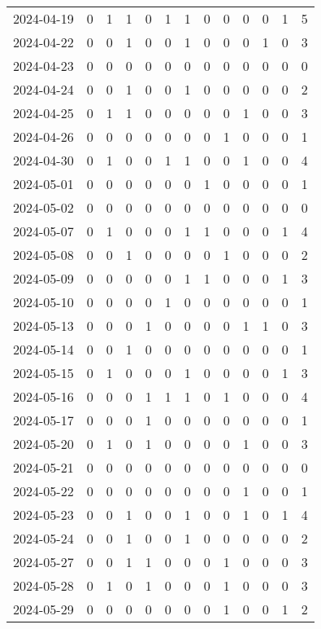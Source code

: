\documentclass[dvipdfmx,oneside]{article}
\begin{document}
\begin{longtable}{lcccccccccccc}
2024-04-19 & 0 & 1 & 1 & 0 & 1 & 1 & 0 & 0 & 0 & 0 & 1 & 5 \\
2024-04-22 & 0 & 0 & 1 & 0 & 0 & 1 & 0 & 0 & 0 & 1 & 0 & 3 \\
2024-04-23 & 0 & 0 & 0 & 0 & 0 & 0 & 0 & 0 & 0 & 0 & 0 & 0 \\
2024-04-24 & 0 & 0 & 1 & 0 & 0 & 1 & 0 & 0 & 0 & 0 & 0 & 2 \\
2024-04-25 & 0 & 1 & 1 & 0 & 0 & 0 & 0 & 0 & 1 & 0 & 0 & 3 \\
2024-04-26 & 0 & 0 & 0 & 0 & 0 & 0 & 0 & 1 & 0 & 0 & 0 & 1 \\
2024-04-30 & 0 & 1 & 0 & 0 & 1 & 1 & 0 & 0 & 1 & 0 & 0 & 4 \\
2024-05-01 & 0 & 0 & 0 & 0 & 0 & 0 & 1 & 0 & 0 & 0 & 0 & 1 \\
2024-05-02 & 0 & 0 & 0 & 0 & 0 & 0 & 0 & 0 & 0 & 0 & 0 & 0 \\
2024-05-07 & 0 & 1 & 0 & 0 & 0 & 1 & 1 & 0 & 0 & 0 & 1 & 4 \\
2024-05-08 & 0 & 0 & 1 & 0 & 0 & 0 & 0 & 1 & 0 & 0 & 0 & 2 \\
2024-05-09 & 0 & 0 & 0 & 0 & 0 & 1 & 1 & 0 & 0 & 0 & 1 & 3 \\
2024-05-10 & 0 & 0 & 0 & 0 & 1 & 0 & 0 & 0 & 0 & 0 & 0 & 1 \\
2024-05-13 & 0 & 0 & 0 & 1 & 0 & 0 & 0 & 0 & 1 & 1 & 0 & 3 \\
2024-05-14 & 0 & 0 & 1 & 0 & 0 & 0 & 0 & 0 & 0 & 0 & 0 & 1 \\
2024-05-15 & 0 & 1 & 0 & 0 & 0 & 1 & 0 & 0 & 0 & 0 & 1 & 3 \\
2024-05-16 & 0 & 0 & 0 & 1 & 1 & 1 & 0 & 1 & 0 & 0 & 0 & 4 \\
2024-05-17 & 0 & 0 & 0 & 1 & 0 & 0 & 0 & 0 & 0 & 0 & 0 & 1 \\
2024-05-20 & 0 & 1 & 0 & 1 & 0 & 0 & 0 & 0 & 1 & 0 & 0 & 3 \\
2024-05-21 & 0 & 0 & 0 & 0 & 0 & 0 & 0 & 0 & 0 & 0 & 0 & 0 \\
2024-05-22 & 0 & 0 & 0 & 0 & 0 & 0 & 0 & 0 & 1 & 0 & 0 & 1 \\
2024-05-23 & 0 & 0 & 1 & 0 & 0 & 1 & 0 & 0 & 1 & 0 & 1 & 4 \\
2024-05-24 & 0 & 0 & 1 & 0 & 0 & 1 & 0 & 0 & 0 & 0 & 0 & 2 \\
2024-05-27 & 0 & 0 & 1 & 1 & 0 & 0 & 0 & 1 & 0 & 0 & 0 & 3 \\
2024-05-28 & 0 & 1 & 0 & 1 & 0 & 0 & 0 & 1 & 0 & 0 & 0 & 3 \\
2024-05-29 & 0 & 0 & 0 & 0 & 0 & 0 & 0 & 1 & 0 & 0 & 1 & 2 \\

\end{longtable}
\end{document}
